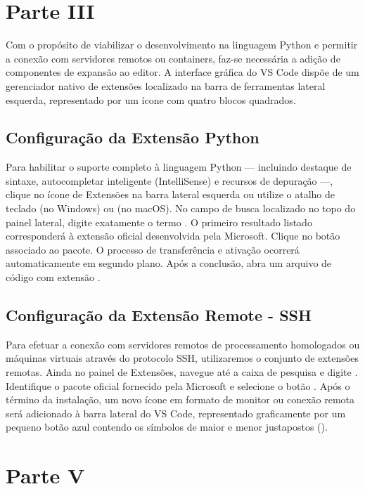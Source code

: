 \section*{Parte III}

Com o propósito de viabilizar o desenvolvimento na linguagem Python e permitir a conexão com servidores remotos ou containers, faz-se necessária a adição de componentes de expansão ao editor. A interface gráfica do VS Code dispõe de um gerenciador nativo de extensões localizado na barra de ferramentas lateral esquerda, representado por um ícone com quatro blocos quadrados.


\subsection*{Configuração da Extensão Python}

Para habilitar o suporte completo à linguagem Python — incluindo destaque de sintaxe, autocompletar inteligente (IntelliSense) e recursos de depuração —, clique no ícone de Extensões na barra lateral esquerda ou utilize o atalho de teclado  (no Windows) ou  (no macOS).
No campo de busca localizado no topo do painel lateral, digite exatamente o termo . O primeiro resultado listado corresponderá à extensão oficial desenvolvida pela Microsoft. Clique no botão  associado ao pacote. O processo de transferência e ativação ocorrerá automaticamente em segundo plano. Após a conclusão, abra um arquivo de código com extensão .

\subsection*{Configuração da Extensão Remote - SSH}

Para efetuar a conexão com servidores remotos de processamento homologados ou máquinas virtuais através do protocolo SSH, utilizaremos o conjunto de extensões remotas.
Ainda no painel de Extensões, navegue até a caixa de pesquisa e digite . Identifique o pacote oficial fornecido pela Microsoft e selecione o botão . Após o término da instalação, um novo ícone em formato de monitor ou conexão remota será adicionado à barra lateral do VS Code, representado graficamente por um pequeno botão azul contendo os símbolos de maior e menor justapostos (\code{><}).

\section*{Parte V}

